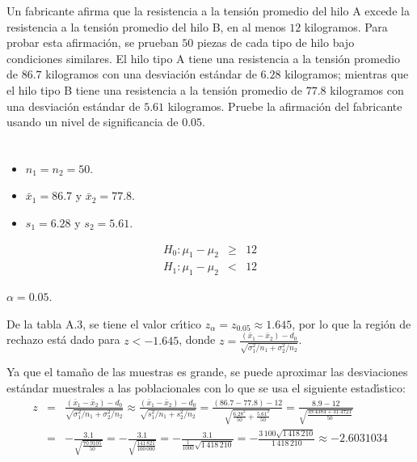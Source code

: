 \begin{enunciado}
 Un fabricante afirma que la resistencia a la tensi\'on promedio del hilo A excede la resistencia a la tensi\'on promedio del hilo B, en al menos $12$ kilogramos. Para probar esta afirmaci\'on, se prueban $50$ piezas de cada tipo de hilo bajo condiciones similares. El hilo tipo A tiene una resistencia a la tensi\'on promedio de $86.7$ kilogramos con una desviaci\'on est\'andar de $6.28$ kilogramos; mientras que el hilo tipo B tiene una resistencia a la tensi\'on promedio de $77.8$ kilogramos con una desviaci\'on est\'andar de $5.61$ kilogramos. Pruebe la afirmaci\'on del fabricante usando un nivel de significancia de $0.05$.
\end{enunciado}

\begin{solucion}
 \begin{datos}
  $\phantom{0}$
  \begin{itemize}
   \item $n_1 = n_2 = 50$.
   \item $\bar{x}_1 = 86.7$ y $\bar{x}_2 = 77.8$.
   \item $s_1 = 6.28$ y $s_2 = 5.61$.
  \end{itemize}
 \end{datos}

 \begin{hipotesis}
  \begin{eqnarray*}
   H_0: \mu_1 - \mu_2 & \geq & 12 \\
   H_1: \mu_1 - \mu_2 & < & 12
  \end{eqnarray*}
 \end{hipotesis}

 \begin{significancia}
  $\alpha = 0.05$.
 \end{significancia}

 \begin{region}
  De la tabla A.3, se tiene el valor cr\'{\i}tico $z_{\alpha} = z_{0.05} \approx 1.645$, por lo que la regi\'on de rechazo est\'a dado para $z < -1.645$, donde $z = \frac{\left( \bar{x}_1 - \bar{x}_2 \right) - d_0}{\sqrt{\sigma_1^2/n_1 + \sigma_2^2/n_2}}$.
 \end{region}

 \begin{estadistico}
  Ya que el tama\~ no de las muestras es grande, se puede aproximar las desviaciones est\'andar muestrales a las poblacionales con lo que se usa el siguiente estad\'{\i}stico:
  \begin{eqnarray*}
   z & = & \frac{\left( \bar{x}_1 - \bar{x}_2 \right) - d_0}{\sqrt{\sigma_1^2/n_1 + \sigma_2^2/n_2}} \approx \frac{\left( \bar{x}_1 - \bar{x}_2 \right) - d_0}{\sqrt{s_1^2/n_1 + s_2^2/n_2}} = \frac{(86.7 - 77.8) - 12}{\sqrt{\frac{6.28^2}{50} + \frac{5.61^2}{50}}} = \frac{8.9-12}{\sqrt{\frac{39.4384 + 31.4721}{50}}} \\
   & = & -\frac{3.1}{\sqrt{\frac{70.9105}{50}}} = -\frac{3.1}{\sqrt{\frac{141\,821}{100\,000}}} = -\frac{3.1}{\frac{1}{1000}\sqrt{1\,418\,210}} = -\frac{3\,100\sqrt{1\,418\,210}}{1\,418\,210} \approx -2.6031034
  \end{eqnarray*}
 \end{estadistico}


\end{solucion}
